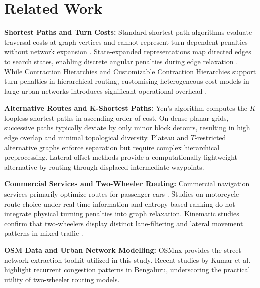 \documentclass[11pt,conference]{IEEEtran}
\begin{document}

\section{Related Work}

\noindent\textbf{Shortest Paths and Turn Costs:}
Standard shortest-path algorithms evaluate traversal costs at graph vertices and cannot represent turn-dependent penalties without network expansion \cite{winter2002modeling,geisberger2011efficient}.
State-expanded representations map directed edges to search states, enabling discrete angular penalties during edge relaxation \cite{anirudhr2026turnaware}.
While Contraction Hierarchies and Customizable Contraction Hierarchies support turn penalties in hierarchical routing, customising heterogeneous cost models in large urban networks introduces significant operational overhead \cite{geisberger2011efficient,bast2016route,delling2017customizable}.

\noindent\textbf{Alternative Routes and K-Shortest Paths:}
Yen's algorithm \cite{yen1971finding} computes the $K$ loopless shortest paths in ascending order of cost.
On dense planar grids, successive paths typically deviate by only minor block detours, resulting in high edge overlap and minimal topological diversity.
Plateau and $T$-restricted alternative graphs \cite{abraham2013alternative} enforce separation but require complex hierarchical preprocessing.
Lateral offset methods provide a computationally lightweight alternative by routing through displaced intermediate waypoints.

\noindent\textbf{Commercial Services and Two-Wheeler Routing:}
Commercial navigation services primarily optimize routes for passenger cars \cite{luxen2011realtime,kumar2025realtime}.
Studies on motorcycle route choice under real-time information \cite{fadilah2024identifying} and entropy-based ranking \cite{asvial2020entropy} do not integrate physical turning penalties into graph relaxation.
Kinematic studies confirm that two-wheelers display distinct lane-filtering and lateral movement patterns in mixed traffic \cite{kotagi2020modeling,das2019modeling,promraksa2022lane}.

\noindent\textbf{OSM Data and Urban Network Modelling:}
OSMnx \cite{boeing2017osmnx} provides the street network extraction toolkit utilized in this study.
Recent studies by Kumar et al.\ \cite{kumar2025realtime} highlight recurrent congestion patterns in Bengaluru, underscoring the practical utility of two-wheeler routing models.
\end{document}
